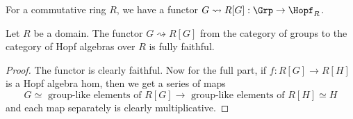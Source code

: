 \begin{definition}
  \label{0-grp-alg}
  \leanok

  For a commutative ring $R$, we have a functor $G \rightsquigarrow R[G] : \Grp \to \Hopf_R$.
\end{definition}


\begin{proposition}
  \label{0-full-faithful-grp-alg}
  \leanok

  Let $R$ be a domain.
  The functor $G \rightsquigarrow R[G]$ from the category of groups to the category of Hopf algebras over $R$ is fully faithful.
\end{proposition}
\begin{proof}
  \leanok

  The functor is clearly faithful.
  Now for the full part, if $f : R[G] \to R[H]$ is a Hopf algebra hom, then we get a series of maps
  \[
    G \simeq \text{ group-like elements of } R[G] \to \text{ group-like elements of } R[H] \simeq H
  \]
  and each map separately is clearly multiplicative.
\end{proof}
